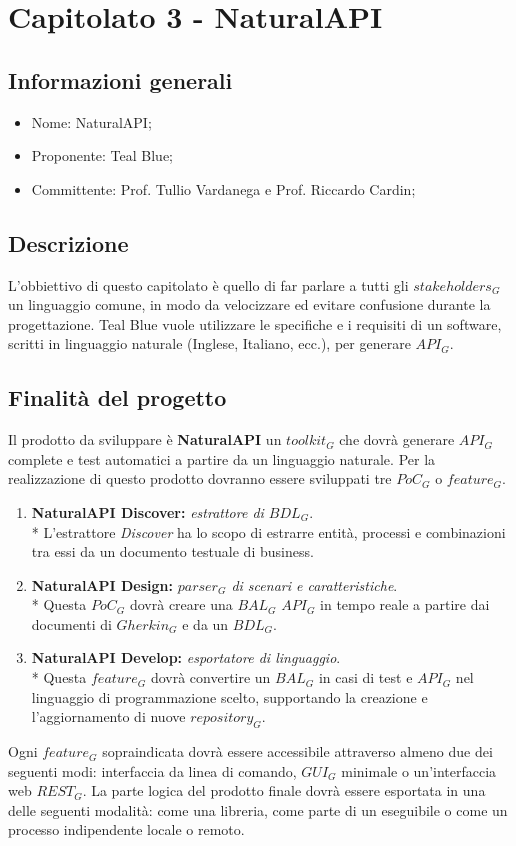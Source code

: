 \section{Capitolato 3 - NaturalAPI}
\subsection{Informazioni generali}
\begin{itemize}
	\item Nome: NaturalAPI;
	\item Proponente: Teal Blue;
	\item Committente: Prof. Tullio Vardanega e Prof. Riccardo Cardin;
\end{itemize}
\subsection{Descrizione}
L'obbiettivo di questo capitolato è quello di far parlare a tutti gli $stakeholders_G$ un linguaggio comune, in modo da velocizzare ed evitare confusione durante la progettazione. Teal Blue vuole utilizzare le specifiche e i requisiti di un software, scritti in linguaggio naturale (Inglese, Italiano, ecc.), per generare $API_G$.
\subsection{Finalità del progetto}
Il prodotto da sviluppare è \textbf{NaturalAPI} un $toolkit_G$ che dovrà generare $API_G$ complete e test automatici a partire da un linguaggio naturale. Per la realizzazione di questo prodotto dovranno essere sviluppati tre $PoC_G$ o $feature_G$.
\begin{enumerate}
	\item \textbf{NaturalAPI Discover: }\textit{estrattore di $BDL_G$}. \\*
	L'estrattore \textit{Discover} ha lo scopo di estrarre entità, processi e combinazioni tra essi da un documento testuale di business.
	\item \textbf{NaturalAPI Design: }\textit{$parser_G$ di scenari e caratteristiche}. \\*
	Questa $PoC_G$ dovrà creare una $BAL_G$ $API_G$ in tempo reale a partire dai documenti di $Gherkin_G$ e da un $BDL_G$.
	\item \textbf{NaturalAPI Develop: }\textit{esportatore di linguaggio}. \\* 
	Questa $feature_G$ dovrà convertire un $BAL_G$ in casi di test e $API_G$ nel linguaggio di programmazione scelto, supportando la creazione e l'aggiornamento di nuove $repository_G$.
\end{enumerate} 
Ogni $feature_G$ sopraindicata dovrà essere accessibile attraverso almeno due dei seguenti modi: interfaccia da linea di comando, $GUI_G$ minimale o un'interfaccia web $REST_G$.
La parte logica del prodotto finale dovrà essere esportata in una delle seguenti modalità: come una libreria, come parte di un eseguibile o come un processo indipendente locale o remoto.  


